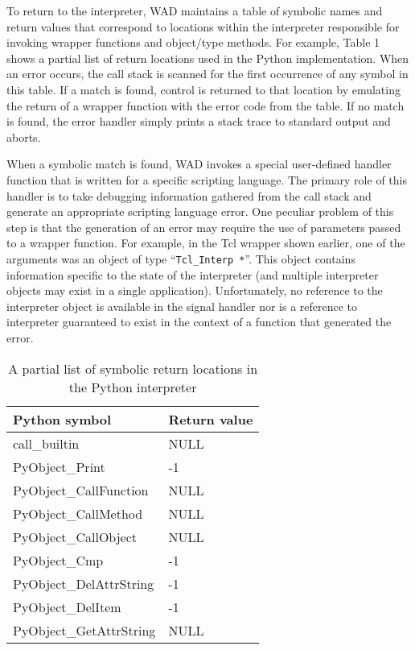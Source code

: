 To return to the interpreter, WAD maintains a table of symbolic names
and return values that correspond to locations within the interpreter
responsible for invoking wrapper functions and object/type methods.
For example, Table 1 shows a partial list of return locations used in
the Python implementation.  When an error occurs, the call stack is
scanned for the first occurrence of any symbol in this table.  If a
match is found, control is returned to that location by emulating the
return of a wrapper function with the error code from the table. If no
match is found, the error handler simply prints a stack trace to
standard output and aborts.

When a symbolic match is found, WAD invokes a special user-defined
handler function that is written for a specific scripting language.
The primary role of this handler is to take debugging information
gathered from the call stack and generate an appropriate scripting
language error.  One peculiar problem of this step is that the
generation of an error may require the use of parameters passed to a
wrapper function.  For example, in the Tcl wrapper shown earlier, one
of the arguments was an object of type ``{\tt Tcl\_Interp *}''.  This
object contains information specific to the state of the interpreter
(and multiple interpreter objects may exist in a single application).
Unfortunately, no reference to the interpreter object is available in the
signal handler nor is a reference to interpreter guaranteed to exist in
the context of a function that generated the error.

\begin{table}[t]
\begin{center}
\begin{tabular}{ll}
Python symbol                 &   Return value \\ \hline
call\_builtin                 &   NULL \\
PyObject\_Print               & -1 \\
PyObject\_CallFunction        & NULL \\
PyObject\_CallMethod          & NULL \\
PyObject\_CallObject          & NULL \\
PyObject\_Cmp                 & -1 \\
PyObject\_DelAttrString       & -1 \\
PyObject\_DelItem             & -1 \\
PyObject\_GetAttrString       & NULL \\
\end{tabular}
\end{center}
\label{returnpoints}
\caption{A partial list of symbolic return locations in the Python interpreter}
\end{table}

